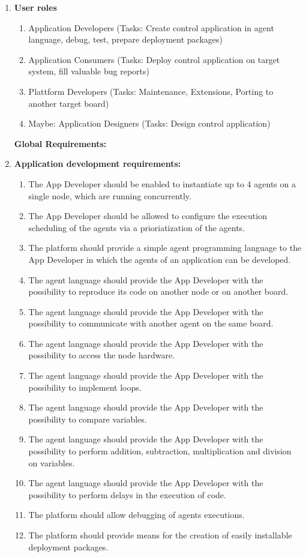 \documentclass{scrreprt}
\begin{document}
\begin{enumerate}

\item\textbf{User roles}
\begin{enumerate}

\item Application Developers (Tasks: Create control application in agent language, debug, test, prepare deployment packages)
\item Application Consumers  (Tasks: Deploy control application on target system, fill valuable bug reports)
\item Plattform Developers (Tasks: Maintenance, Extensions, Porting to another target board)
\item Maybe: Application Designers (Tasks: Design control application)
\end{enumerate}


\textbf{
Global Requirements:
}


\item	\textbf{Application development requirements:}
\begin{enumerate}
\item The App Developer should be enabled to instantiate up to 4 agents on a single node, which are running concurrently.
\item The App Developer should be allowed to configure the execution scheduling of the agents via a prioriatization of the agents.
\item The platform should provide a simple agent programming language to the App Developer in which the agents of an application can be developed.
\item The agent language should provide the App Developer with the possibility to reproduce its code on another node or on another board.
\item The agent language should provide the App Developer with the possibility to communicate with another agent on the same board.
\item The agent language should provide the App Developer with the possibility to access the node hardware.
\item The agent language should provide the App Developer with the possibility to implement loops. 
\item The agent language should provide the App Developer with the possibility to compare variables.
\item The agent language should provide the App Developer with the possibility to perform addition, subtraction, multiplication and division on variables.
\item The agent language should provide the App Developer with the possibility to perform delays in the execution of code.
\item The platform should allow debugging of agents executions.
\item The platform should provide means for the creation of easily installable deployment packages.
\end{enumerate}


\end{enumerate}
\end{document}
